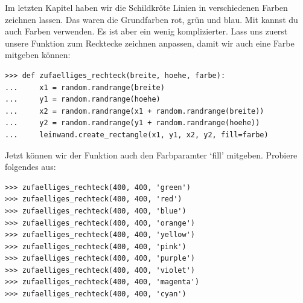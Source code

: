 Im letzten Kapitel haben wir die Schildkröte Linien in verschiedenen Farben zeichnen lassen. Das waren die Grundfarben rot, grün und blau. Mit  kannst du auch Farben verwenden. Es ist aber ein wenig komplizierter. Lass uns zuerst unsere Funktion zum Recktecke zeichnen anpassen, damit wir auch eine Farbe mitgeben können:

\begin{Verbatim}[frame=single]
>>> def zufaelliges_rechteck(breite, hoehe, farbe):
...     x1 = random.randrange(breite)
...     y1 = random.randrange(hoehe)
...     x2 = random.randrange(x1 + random.randrange(breite))
...     y2 = random.randrange(y1 + random.randrange(hoehe))
...     leinwand.create_rectangle(x1, y1, x2, y2, fill=farbe)
\end{Verbatim}

Jetzt können wir der  Funktion auch den Farbparamter `fill' mitgeben. Probiere folgendes aus:

\begin{Verbatim}[frame=single]
>>> zufaelliges_rechteck(400, 400, 'green')
>>> zufaelliges_rechteck(400, 400, 'red')
>>> zufaelliges_rechteck(400, 400, 'blue')
>>> zufaelliges_rechteck(400, 400, 'orange')
>>> zufaelliges_rechteck(400, 400, 'yellow')
>>> zufaelliges_rechteck(400, 400, 'pink')
>>> zufaelliges_rechteck(400, 400, 'purple')
>>> zufaelliges_rechteck(400, 400, 'violet')
>>> zufaelliges_rechteck(400, 400, 'magenta')
>>> zufaelliges_rechteck(400, 400, 'cyan')
\end{Verbatim}


